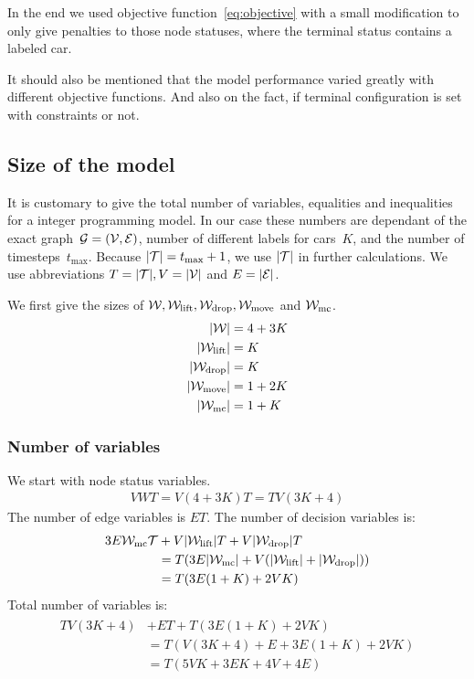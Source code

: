 In the end we used objective function~\eqref{eq:objective} with a small
modification to only give penalties to those node statuses, where the terminal
status contains a labeled car.

It should also be mentioned that the model performance varied greatly with
different objective functions. And also on the fact, if terminal configuration
is set with constraints or not.

\subsection{Size of the model}
It is customary to give the total number of variables, equalities and
inequalities for a integer programming model. In our case these numbers are
dependant of the exact graph~$\mathcal{G}=(\mathcal{V},\mathcal{E})$, number of different labels for
cars~$K$, and the number of timesteps~$t_{\max}$. Because $|\mathcal{T}| = t_{\max} + 1$, we
use $|\mathcal{T}|$ in further calculations. We use abbreviations $T = |\mathcal{T}|, V
= |\mathcal{V}|$ and $E = |\mathcal{E}|$.

We first give the sizes of $\mathcal{W}, \mathcal{W}_\mathrm{lift}, \mathcal{W}_\mathrm{drop}, \mathcal{W}_\mathrm{move}$ and $\mathcal{W}_\mathrm{mc}$.
\begin{align}
    |\mathcal{W}| &= 4 + 3K\\
    |\mathcal{W}_\mathrm{lift}| &= K\\
    |\mathcal{W}_\mathrm{drop}| &= K\\
    |\mathcal{W}_\mathrm{move}| &= 1 + 2K\\
    |\mathcal{W}_\mathrm{mc}| &= 1 + K
\end{align}
\subsubsection{Number of variables}
\label{sec:numv}
We start with node status variables.
\begin{align}
    VWT = V(4 + 3K)T = TV(3K + 4)
\end{align}
The number of edge variables is $ET$.
The number of decision variables is:
\begin{align}
    \begin{split}
        3E\mathcal{W}_\mathrm{mc}\mathcal{T} &+ V|\mathcal{W}_\mathrm{lift}|T + V|\mathcal{W}_\mathrm{drop}|T\\
        &= T(3E|\mathcal{W}_\mathrm{mc}| + V(|\mathcal{W}_\mathrm{lift}| + |\mathcal{W}_\mathrm{drop}|))\\
        &= T(3E(1+K) + 2VK)
    \end{split}
\end{align}
Total number of variables is:
\begin{align}
    \begin{split}
        TV(3K+4) &+ ET + T(3E(1+K) + 2VK)\\
        &= T(V(3K+4) + E + 3E(1+K) + 2VK)\\
        &= T(5VK + 3EK + 4V +4E)
    \end{split}
\end{align}

